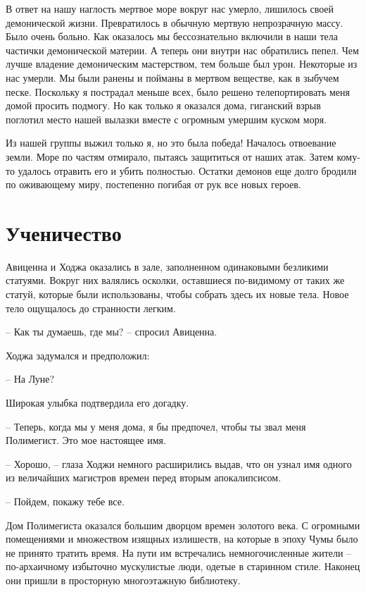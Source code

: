 \documentclass[12pt,a4paper]{article}
\begin{document}
В ответ на нашу наглость мертвое море вокруг нас умерло, лишилось своей демонической жизни. Превратилось в обычную мертвую непрозрачную массу. Было очень больно. Как оказалось мы бессознательно включили в наши тела частички демонической материи. А теперь они внутри нас обратились пепел. Чем лучше владение демоническим мастерством, тем больше был урон. Некоторые из нас умерли. Мы были ранены и пойманы в мертвом веществе, как в зыбучем песке. Поскольку я пострадал меньше всех, было решено телепортировать меня домой просить подмогу. Но как только я оказался дома, гиганский взрыв поглотил место нашей вылазки вместе с огромным умершим куском моря.

Из нашей группы выжил только я, но это была победа! Началось отвоевание земли. Море по частям отмирало, пытаясь защититься от наших атак. Затем кому-то удалось отравить его и убить полностью. Остатки демонов еще долго бродили по оживающему миру, постепенно погибая от рук все новых героев.

\section*{Ученичество}

Авиценна и Ходжа оказались в зале, заполненном одинаковыми безликими статуями. Вокруг них валялись осколки, оставшиеся по-видимому от таких же статуй, которые были использованы, чтобы собрать здесь их новые тела. Новое тело ощущалось до странности легким.

-- Как ты думаешь, где мы? -- спросил Авиценна.

Ходжа задумался и предположил:

-- На Луне?

Широкая улыбка подтвердила его догадку.

-- Теперь, когда мы у меня дома, я бы предпочел, чтобы ты звал меня Полимегист. Это мое настоящее имя.

-- Хорошо, -- глаза Ходжи немного расширились выдав, что он узнал имя одного из величайших магистров времен перед вторым апокалипсисом.

-- Пойдем, покажу тебе все.

Дом Полимегиста оказался большим дворцом времен золотого века. С огромными помещениями и множеством изящных излишеств, на которые в эпоху Чумы было не принято тратить время. На пути им встречались немногочисленные жители -- по-архаичному избыточно мускулистые люди, одетые в старинном стиле. Наконец они пришли в просторную многоэтажную библиотеку.
\end{document}
